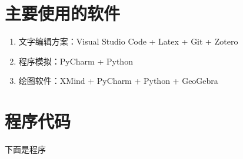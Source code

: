 

\nocite{*}      %





\appendix
\section{主要使用的软件}

\begin{enumerate}
    \item 文字编辑方案：Visual Studio Code + Latex + Git + Zotero
    \item 程序模拟：PyCharm + Python
    \item 绘图软件：XMind + PyCharm + Python + GeoGebra
\end{enumerate}

\section{程序代码}

下面是程序